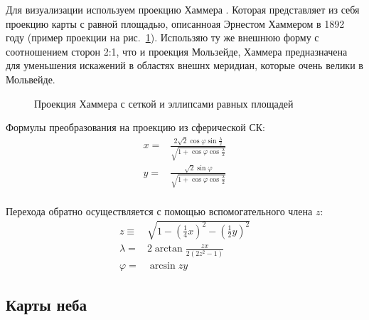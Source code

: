 \documentclass[14pt]{article} %
\begin{document}
Для визуализации используем проекцию Хаммера . Которая представляет из себя проекцию карты с равной площадью, описанноая Эрнестом Хаммером в 1892 году (пример проекции на рис.~\ref{img:hammtiss}). Использяю ту же внешнюю форму с соотношением сторон 2:1, что и проекция Мользейде, Хаммера предназначена для уменьшения искажений в областях внешнх меридиан, которые очень велики в Мольвейде. 

\begin{figure}[h!]
\caption{Проекция Хаммера с сеткой и эллипсами равных площадей}
\label{img:hammtiss}
\end{figure}

Формулы преобразования на проекцию из сферической СК:
\begin{equation*}
\begin{array}{cl}
x = &\frac{2 \sqrt 2 \cos \varphi \sin \frac{\lambda}{2}}{\sqrt{1 + \cos \varphi \cos \frac{\lambda}{2}}}\\
y = &\frac{\sqrt 2\sin \varphi}{\sqrt{1 + \cos \varphi \cos \frac{\lambda}{2}}}\\
\end{array}
\end{equation*}

Перехода обратно осуществляется с помощью вспомогательного члена $z$:
\begin{equation*}
\begin{array}{lll}
z \equiv & \sqrt{1 - \left(\tfrac14 x\right)^2 - \left(\tfrac12 y\right)^2}\\
\lambda = & 2 \arctan \frac{zx}{2\left(2z^2 - 1\right)}\\
\varphi = & \arcsin {zy}
\end{array}
\end{equation*}

\subsection{Карты неба}\label{sub:smthrs}
\end{document}
